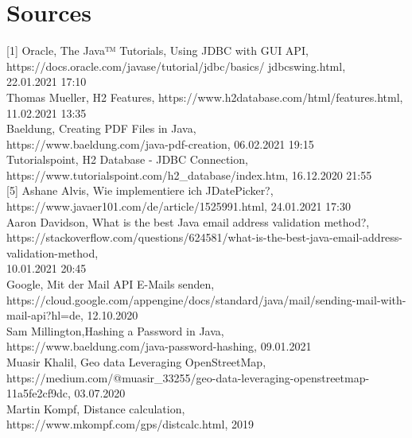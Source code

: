 \documentclass[a4paper, 12pt]{report}
\begin{document}
\chapter{Sources}

[1] Oracle, The Java™ Tutorials, Using JDBC with GUI API,\\
https://docs.oracle.com/javase/tutorial/jdbc/basics/		jdbcswing.html, \\22.01.2021 17:10 \\\relax
[2] Thomas Mueller, H2 Features, https://www.h2database.com/html/features.html,\\ 11.02.2021 13:35 \\\relax
[3] Baeldung, Creating PDF Files in Java, \\https://www.baeldung.com/java-pdf-creation, 06.02.2021 19:15 \\\relax
[4] Tutorialspoint, H2 Database - JDBC Connection, \\https://www.tutorialspoint.com/h2_database/index.htm, 16.12.2020 21:55 \\\relax
[5] Ashane Alvis, Wie implementiere ich JDatePicker?, \\https://www.javaer101.com/de/article/1525991.html, 24.01.2021 17:30 \\\relax
[6] Aaron Davidson, What is the best Java email address validation method?, \\https://stackoverflow.com/questions/624581/what-is-the-best-java-email-address-validation-method, \\10.01.2021 20:45 \\\relax
[7]Google, Mit der Mail API E-Mails senden, \\https://cloud.google.com/appengine/docs/standard/java/mail/sending-mail-with-mail-api?hl=de, 12.10.2020\\\relax
[8]Sam Millington,Hashing a Password in Java,\\https://www.baeldung.com/java-password-hashing, 09.01.2021 \\\relax
[9]Muasir Khalil, Geo data Leveraging OpenStreetMap,\\https://medium.com/@muasir_33255/geo-data-leveraging-openstreetmap-11a5fe2cf9dc, 03.07.2020\\\relax
[10]Martin Kompf, Distance calculation,\\https://www.mkompf.com/gps/distcalc.html, 2019
\end{document}
